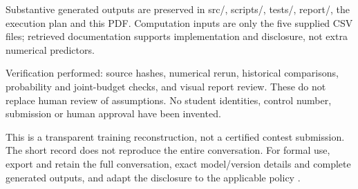 \documentclass[11pt,a4paper]{article}
\begin{document}
Substantive generated outputs are preserved in src/, scripts/, tests/, report/, the execution plan and this PDF. Computation inputs are only the five supplied CSV files; retrieved documentation supports implementation and disclosure, not extra numerical predictors.

Verification performed: source hashes, numerical rerun, historical comparisons, probability and joint-budget checks, and visual report review. These do not replace human review of assumptions. No student identities, control number, submission or human approval have been invented.

This is a transparent training reconstruction, not a certified contest submission. The short record does not reproduce the entire conversation. For formal use, export and retain the full conversation, exact model/version details and complete generated outputs, and adapt the disclosure to the applicable policy \cite{comap-ai}.
\end{document}
